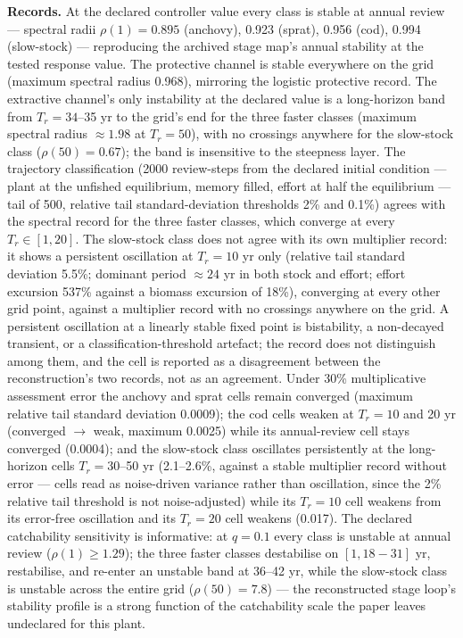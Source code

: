 \documentclass[11pt]{article}
\begin{document}
\textbf{Records.} At the declared controller value every class is stable
at annual review --- spectral radii \(\rho(1) = 0.895\) (anchovy), 0.923
(sprat), 0.956 (cod), 0.994 (slow-stock) --- reproducing the archived
stage map's annual stability at the tested response value. The
protective channel is stable everywhere on the grid (maximum spectral
radius 0.968), mirroring the logistic protective record. The extractive
channel's only instability at the declared value is a long-horizon band
from \(T_r = 34\)--35 yr to the grid's end for the three faster classes
(maximum spectral radius \(\approx 1.98\) at \(T_r = 50\)), with no
crossings anywhere for the slow-stock class (\(\rho(50) = 0.67\)); the
band is insensitive to the steepness layer. The trajectory
classification (2000 review-steps from the declared initial condition
--- plant at the unfished equilibrium, memory filled, effort at half the
equilibrium --- tail of 500, relative tail standard-deviation thresholds
2\% and 0.1\%) agrees with the spectral record for the three faster
classes, which converge at every \(T_r \in [1,20]\). The slow-stock
class does not agree with its own multiplier record: it shows a
persistent oscillation at \(T_r = 10\) yr only (relative tail standard
deviation 5.5\%; dominant period \(\approx 24\) yr in both stock and
effort; effort excursion 537\% against a biomass excursion of 18\%),
converging at every other grid point, against a multiplier record with
no crossings anywhere on the grid. A persistent oscillation at a
linearly stable fixed point is bistability, a non-decayed transient, or
a classification-threshold artefact; the record does not distinguish
among them, and the cell is reported as a disagreement between the
reconstruction's two records, not as an agreement. Under 30\%
multiplicative assessment error the anchovy and sprat cells remain
converged (maximum relative tail standard deviation 0.0009); the cod
cells weaken at \(T_r = 10\) and 20 yr (converged \(\to\) weak, maximum
0.0025) while its annual-review cell stays converged (0.0004); and the
slow-stock class oscillates persistently at the long-horizon cells
\(T_r = 30\)--50 yr (2.1--2.6\%, against a stable multiplier record
without error --- cells read as noise-driven variance rather than
oscillation, since the 2\% relative tail threshold is not
noise-adjusted) while its \(T_r = 10\) cell weakens from its error-free
oscillation and its \(T_r = 20\) cell weakens (0.017). The declared
catchability sensitivity is informative: at \(q = 0.1\) every class is
unstable at annual review (\(\rho(1) \ge 1.29\)); the three faster
classes destabilise on \([1, 18{-}31]\) yr, restabilise, and re-enter an
unstable band at 36--42 yr, while the slow-stock class is unstable
across the entire grid (\(\rho(50) = 7.8\)) --- the reconstructed stage
loop's stability profile is a strong function of the catchability scale
the paper leaves undeclared for this plant.
\end{document}
